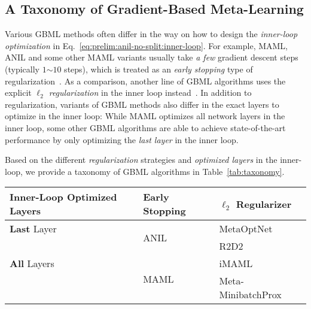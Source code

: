 \documentclass{article}
\begin{document}
\vspace{-1em}
\subsection{A Taxonomy of Gradient-Based Meta-Learning}
Various GBML methods often differ in the way on how to design the \emph{inner-loop optimization} in Eq.~\eqref{eq:prelim:anil-no-split:inner-loop}. For example, MAML, ANIL and some other MAML variants usually take \textit{a few} gradient descent steps (typically $1$$\sim$$10$ steps), which is treated as an \textit{early stopping} type of regularization~\cite{imaml,grant2018recasting}. As a comparison, another line of GBML algorithms uses the explicit \textit{$\ell_2$ regularization} in the inner loop instead~\cite{imaml,metaOptNet,r2d2,zhou2019efficient,goldblum2020unraveling}. In addition to regularization, variants of GBML methods also differ in the exact layers to optimize in the inner loop: While MAML optimizes all network layers in the inner loop, some other GBML algorithms are able to achieve state-of-the-art performance \cite{metaOptNet} by only optimizing the \textit{last layer} in the inner loop.

Based on the different \textit{regularization} strategies and \textit{optimized layers} in the inner-loop, we provide a taxonomy of GBML algorithms in Table~\ref{tab:taxonomy}.
\begin{table*}[tb]
    \centering
    \caption{A taxonomy of gradient-based meta-learning algorithms based on the algorithmic design of Eq.~\eqref{eq:prelim:anil-no-split:inner-loop}.}
    \label{tab:taxonomy}
    \vspace{+5pt}
    \begin{tabular}{l|*2l}\toprule
    Inner-Loop Optimized Layers &  \textbf{Early Stopping} & \textbf{$\ell_2$ Regularizer}\\\midrule
    \textbf{Last} Layer  &  \multirow{2}{*}{ANIL \citep{raghu2019rapid}} & MetaOptNet \citep{metaOptNet} \\
                         &                                               & R2D2 \citep{r2d2} \\\midrule
    \textbf{All} Layers  &  \multirow{2}{*}{MAML \citep{maml}} & iMAML \citep{imaml} \\
                        &                                            & Meta-MinibatchProx \citep{zhou2019efficient}\\\bottomrule
    \end{tabular}
\end{table*}
\end{document}
